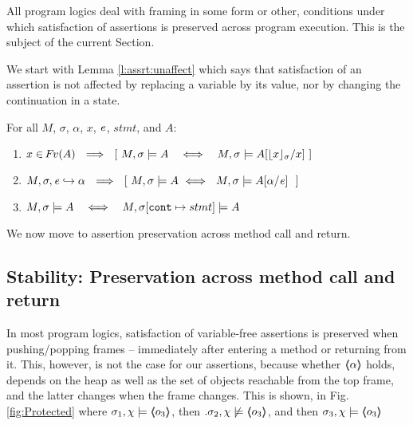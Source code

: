 All program logics deal with framing in some form or other, \ie conditions under which  satisfaction of  assertions is preserved across program execution. 
This is the subject of the current Section.

We start with  Lemma \ref{l:assrt:unaffect}  which says that satisfaction of an assertion is not affected by replacing a variable by its value, nor by changing the continuation in a state.


\begin{lemma}
\label{lemma:addr:expr}
\label{l:assrt:unaffect}
For all $M$, $\sigma$, $\alpha$, $x$, $\mathit{e}$, $stmt$, and $A$:

\begin{enumerate}
\item
\label{one:ad:exp}
$x\in \fv(A) \ \ \Longrightarrow \ \ [ \ \satisfiesA{M}{\sigma}{A}   \ \ \ \Longleftrightarrow\ \ \ \satisfiesA{M}{\sigma}{A[{\interpret \sigma x}/x]} \ ] $ 
\item
$\eval{M}{\sigma}{{\re}}{\alpha}  \ \ \Longrightarrow\ \  [ \ \satisfiesA{M}{\sigma}{A} \  \Longleftrightarrow\   \  \satisfiesA{M}{\sigma}{A[\alpha/\re]} \  \  ]$
\item
$ \satisfiesA{M}{\sigma}{A}   \ \ \ \Longleftrightarrow\ \ \ \satisfiesA{M}{\sigma[\prg{cont}\mapsto stmt]}{A}$ 
\end{enumerate}

\end{lemma}

 \noindent
We now move to assertion preservation across method call and return. %

\subsection{Stability: Preservation across method call and return}
\label{s:preserve:call:ret}
In most program logics, satisfaction of  variable-free assertions  is preserved when pushing/popping frames
-- \ie immediately after entering a method or  returning from it.
This, however, is not   the case for our assertions, because whether  $\langle\!\!\langle \alpha \rangle\!\!\rangle$ holds, depends on the heap as well as the set of objects reachable from the top frame, and
the latter  changes when the frame changes.
This is shown, \eg in  Fig. \ref{fig:Protected} where 
$\sigma_1,\chi \models \langle\!\!\langle o_3 \rangle\!\!\rangle$, then $.\sigma_2,\chi \not\models \langle\!\!\langle o_3 \rangle\!\!\rangle$, and then $\sigma_3,\chi  \models \langle\!\!\langle o_3 \rangle\!\!\rangle$

